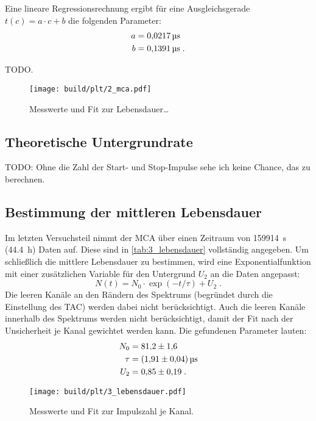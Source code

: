 Eine lineare Regressionsrechnung ergibt
für eine Ausgleichsgerade $t(c) = a \cdot c + b$
die folgenden Parameter:
\begin{align*}
    a &=\SI{0.0217 \pm 0}{\micro\second} \\
    b &=\SI{0.1391 \pm 0}{\micro\second} \; .
\end{align*}

\begin{table}
    \centering
    \caption{TODO.}
    \label{tab:2_mca}
\end{table}

\begin{figure}
    \centering
    \texttt{[image: build/plt/2\_mca.pdf]}
    \caption{Messwerte und Fit zur Lebensdauer…}
    \label{fig:plt:2_mca}
\end{figure}


\FloatBarrier
\subsection{Theoretische Untergrundrate}
TODO: Ohne die Zahl der Start- und Stop-Impulse sehe ich keine Chance, das zu berechnen.


\FloatBarrier
\subsection{Bestimmung der mittleren Lebensdauer}
Im letzten Versuchsteil nimmt der \ac{MCA} über einen Zeitraum von \SI{159914}{\second} (\SI{44.4}{\hour}) Daten auf.
Diese sind in \autoref{tab:3_lebensdauer} vollständig angegeben.
Um schließlich die mittlere Lebensdauer zu bestimmen,
wird eine Exponentialfunktion mit einer zusätzlichen Variable für den Untergrund $U_2$ an die Daten angepasst:
\begin{equation*}
    N(t) = N_0 \cdot \exp (-t / \tau) + U_2 \; .
\end{equation*}
Die leeren Kanäle an den Rändern des Spektrums (begründet durch die Einstellung des \ac{TAC}) werden dabei nicht berücksichtigt.
Auch die leeren Kanäle innerhalb des Spektrums werden nicht berücksichtigt,
damit der Fit nach der Unsicherheit je Kanal gewichtet werden kann.
Die gefundenen Parameter lauten:
\begin{align*}
    N_0 &= \num{81.2 \pm 1.6} \\
    \tau &= \SI{1.91 \pm 0.04}{\micro\second} \\
    U_2 &= \num{0.85 \pm 0.19} \; .
\end{align*}

\begin{figure}
    \centering
    \texttt{[image: build/plt/3\_lebensdauer.pdf]}
    \caption{Messwerte und Fit zur Impulszahl je Kanal.}
    \label{fig:plt:3_lebensdauer}
\end{figure}
